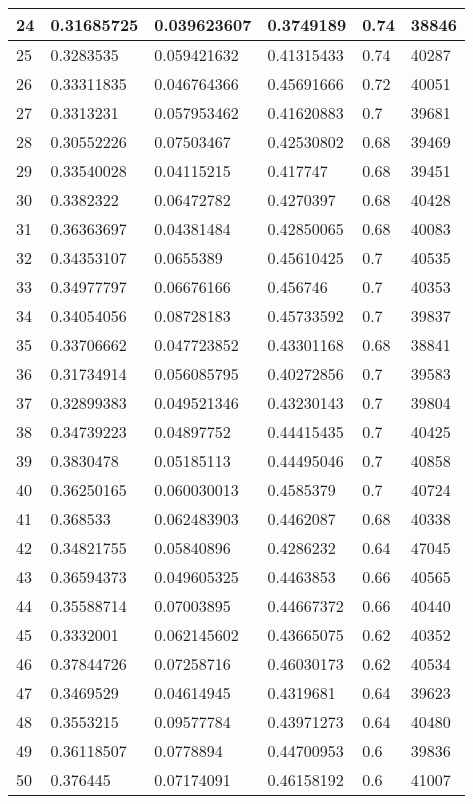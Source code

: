 \begin{longtable}{|l|l|l|l|l|l|}
24 & 0.31685725 & 0.039623607 & 0.3749189 & 0.74 & 38846 \\ \hline 
25 & 0.3283535 & 0.059421632 & 0.41315433 & 0.74 & 40287 \\ \hline 
26 & 0.33311835 & 0.046764366 & 0.45691666 & 0.72 & 40051 \\ \hline 
27 & 0.3313231 & 0.057953462 & 0.41620883 & 0.7 & 39681 \\ \hline 
28 & 0.30552226 & 0.07503467 & 0.42530802 & 0.68 & 39469 \\ \hline 
29 & 0.33540028 & 0.04115215 & 0.417747 & 0.68 & 39451 \\ \hline 
30 & 0.3382322 & 0.06472782 & 0.4270397 & 0.68 & 40428 \\ \hline 
31 & 0.36363697 & 0.04381484 & 0.42850065 & 0.68 & 40083 \\ \hline 
32 & 0.34353107 & 0.0655389 & 0.45610425 & 0.7 & 40535 \\ \hline 
33 & 0.34977797 & 0.06676166 & 0.456746 & 0.7 & 40353 \\ \hline 
34 & 0.34054056 & 0.08728183 & 0.45733592 & 0.7 & 39837 \\ \hline 
35 & 0.33706662 & 0.047723852 & 0.43301168 & 0.68 & 38841 \\ \hline 
36 & 0.31734914 & 0.056085795 & 0.40272856 & 0.7 & 39583 \\ \hline 
37 & 0.32899383 & 0.049521346 & 0.43230143 & 0.7 & 39804 \\ \hline 
38 & 0.34739223 & 0.04897752 & 0.44415435 & 0.7 & 40425 \\ \hline 
39 & 0.3830478 & 0.05185113 & 0.44495046 & 0.7 & 40858 \\ \hline 
40 & 0.36250165 & 0.060030013 & 0.4585379 & 0.7 & 40724 \\ \hline 
41 & 0.368533 & 0.062483903 & 0.4462087 & 0.68 & 40338 \\ \hline 
42 & 0.34821755 & 0.05840896 & 0.4286232 & 0.64 & 47045 \\ \hline 
43 & 0.36594373 & 0.049605325 & 0.4463853 & 0.66 & 40565 \\ \hline 
44 & 0.35588714 & 0.07003895 & 0.44667372 & 0.66 & 40440 \\ \hline 
45 & 0.3332001 & 0.062145602 & 0.43665075 & 0.62 & 40352 \\ \hline 
46 & 0.37844726 & 0.07258716 & 0.46030173 & 0.62 & 40534 \\ \hline 
47 & 0.3469529 & 0.04614945 & 0.4319681 & 0.64 & 39623 \\ \hline 
48 & 0.3553215 & 0.09577784 & 0.43971273 & 0.64 & 40480 \\ \hline 
49 & 0.36118507 & 0.0778894 & 0.44700953 & 0.6 & 39836 \\ \hline 
50 & 0.376445 & 0.07174091 & 0.46158192 & 0.6 & 41007 \\ \hline 
\end{longtable}